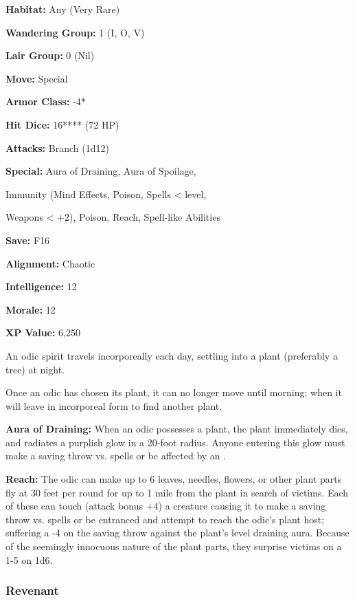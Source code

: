 \begin{multicols*}{2}
{\textbf{Habitat:} Any (Very Rare)

\textbf{Wandering Group:} 1 (I, O, V)

\textbf{Lair Group:} 0 (Nil)

\textbf{Move:} Special

\textbf{Armor Class:} -4*

\textbf{Hit Dice:} 16**** (72 HP)

\textbf{Attacks:} Branch (1d12)

\textbf{Special:} Aura of Draining, Aura of Spoilage, 

Immunity (Mind Effects, Poison, Spells <  level, 

Weapons < +2), Poison, Reach, Spell-like Abilities

\textbf{Save:} F16

\textbf{Alignment:} Chaotic

\textbf{Intelligence:} 12

\textbf{Morale:} 12

\textbf{XP Value:} 6,250}

An odic spirit travels incorporeally each day, settling into a plant (preferably a tree) at night.

Once an odic has chosen its plant, it can no longer move until morning; when it will leave in incorporeal form to find another plant.

\textbf{Aura of Draining:} When an odic possesses a plant, the plant immediately dies, and radiates a purplish glow in a 20-foot radius. Anyone entering this glow must make a saving throw vs. spells or be affected by an .

\textbf{Reach:} The odic can make up to 6 leaves, needles, flowers, or other plant parts fly at 30 feet per round for up to 1 mile from the plant in search of victims. Each of these can touch (attack bonus +4) a creature causing it to make a saving throw vs. spells or be entranced and attempt to reach the odic’s plant host; suffering a -4 on the saving throw against the plant’s level draining aura. Because of the seemingly innocuous nature of the plant parts, they surprise victims on a 1-5 on 1d6.

\subsubsection{Revenant}
\end{multicols*}
